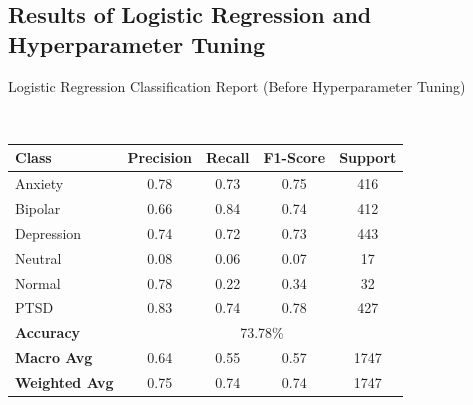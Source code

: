 \subsection{Results of Logistic Regression and Hyperparameter Tuning}

\begin{center}
    \caption{Logistic Regression Classification Report (Before Hyperparameter Tuning)} \\
\begin{tabular}{|l|c|c|c|c|}
\hline
\textbf{Class} & \textbf{Precision} & \textbf{Recall} & \textbf{F1-Score} & \textbf{Support} \\ \hline
Anxiety        & 0.78               & 0.73            & 0.75              & 416              \\ \hline
Bipolar        & 0.66               & 0.84            & 0.74              & 412              \\ \hline
Depression     & 0.74               & 0.72            & 0.73              & 443              \\ \hline
Neutral        & 0.08               & 0.06            & 0.07              & 17               \\ \hline
Normal         & 0.78               & 0.22            & 0.34              & 32               \\ \hline
PTSD           & 0.83               & 0.74            & 0.78              & 427              \\ \hline
\textbf{Accuracy} & \multicolumn{4}{|c|}{73.78\%} \\ \hline
\textbf{Macro Avg} & 0.64            & 0.55            & 0.57              & 1747             \\ \hline
\textbf{Weighted Avg} & 0.75         & 0.74            & 0.74              & 1747             \\ \hline
\end{tabular} \\

 \vspace{0.25in}%


\end{center}
